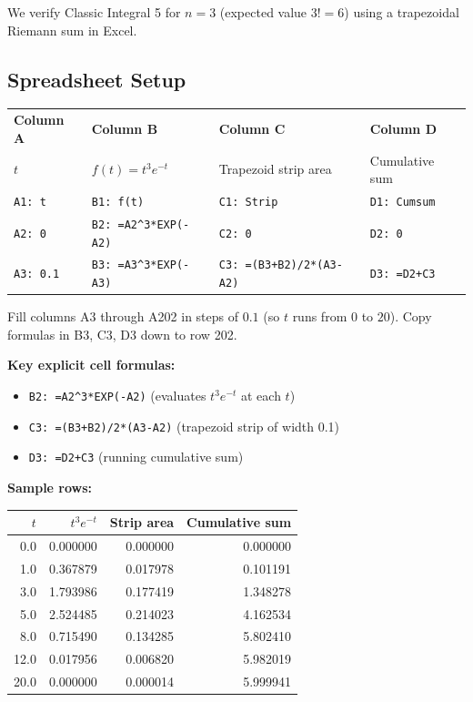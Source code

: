 \documentclass[12pt,a4paper]{article}
\begin{document}
We verify Classic Integral 5 for $n = 3$ (expected value $3! = 6$) using a
trapezoidal Riemann sum in Excel.

\subsection*{Spreadsheet Setup}

\begin{center}
\begin{tabular}{@{}llll@{}}
\toprule
\textbf{Column A} & \textbf{Column B} & \textbf{Column C}
  & \textbf{Column D} \\
$t$ & $f(t) = t^3 e^{-t}$ & Trapezoid strip area & Cumulative sum \\
\midrule
\texttt{A1: t}  & \texttt{B1: f(t)}  & \texttt{C1: Strip}  & \texttt{D1: Cumsum} \\
\texttt{A2: 0}  & \texttt{B2: =A2\^{}3*EXP(-A2)}  & \texttt{C2: 0}  & \texttt{D2: 0} \\
\texttt{A3: 0.1} & \texttt{B3: =A3\^{}3*EXP(-A3)} & \texttt{C3: =(B3+B2)/2*(A3-A2)} & \texttt{D3: =D2+C3} \\
\bottomrule
\end{tabular}
\end{center}

Fill columns A3 through A202 in steps of $0.1$ (so $t$ runs from $0$ to $20$).
Copy formulas in B3, C3, D3 down to row 202.

\medskip
\textbf{Key explicit cell formulas:}
\begin{itemize}
  \item \texttt{B2: =A2\^{}3*EXP(-A2)} \quad (evaluates $t^3 e^{-t}$ at each $t$)
  \item \texttt{C3: =(B3+B2)/2*(A3-A2)} \quad (trapezoid strip of width 0.1)
  \item \texttt{D3: =D2+C3} \quad (running cumulative sum)
\end{itemize}

\medskip
\textbf{Sample rows:}

\begin{center}
\begin{tabular}{@{}rrrr@{}}
\toprule
$t$ & $t^3 e^{-t}$ & Strip area & Cumulative sum \\
\midrule
0.0  & 0.000000 & 0.000000 & 0.000000 \\
1.0  & 0.367879 & 0.017978 & 0.101191 \\
3.0  & 1.793986 & 0.177419 & 1.348278 \\
5.0  & 2.524485 & 0.214023 & 4.162534 \\
8.0  & 0.715490 & 0.134285 & 5.802410 \\
12.0 & 0.017956 & 0.006820 & 5.982019 \\
20.0 & 0.000000 & 0.000014 & 5.999941 \\
\bottomrule
\end{tabular}
\end{center}
\end{document}
